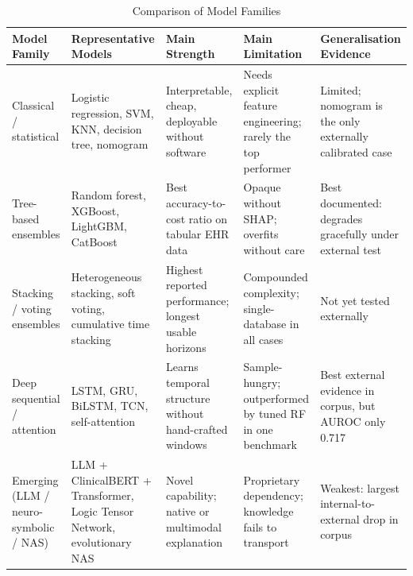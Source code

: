 \documentclass[conference]{IEEEtran}
\begin{document}
\begin{table}[t]
\caption{Comparison of Model Families}
\label{tab:families}
\centering
\footnotesize
\begin{tabular}{@{}p{2.3cm}p{3.5cm}p{2.8cm}p{3.4cm}p{3.6cm}@{}}
\toprule
\textbf{Model Family} & \textbf{Representative Models} & \textbf{Main Strength} & \textbf{Main Limitation} & \textbf{Generalisation Evidence} \\
\midrule
Classical / statistical & Logistic regression, SVM, KNN, decision tree, nomogram & Interpretable, cheap, deployable without software & Needs explicit feature engineering; rarely the top performer & Limited; nomogram is the only externally calibrated case \\
Tree-based ensembles & Random forest, XGBoost, LightGBM, CatBoost & Best accuracy-to-cost ratio on tabular EHR data & Opaque without SHAP; overfits without care & Best documented: degrades gracefully under external test \\
Stacking / voting ensembles & Heterogeneous stacking, soft voting, cumulative time stacking & Highest reported performance; longest usable horizons & Compounded complexity; single-database in all cases & Not yet tested externally \\
Deep sequential / attention & LSTM, GRU, BiLSTM, TCN, self-attention & Learns temporal structure without hand-crafted windows & Sample-hungry; outperformed by tuned RF in one benchmark & Best external evidence in corpus, but AUROC only 0.717 \\
Emerging (LLM / neuro-symbolic / NAS) & LLM + ClinicalBERT + Transformer, Logic Tensor Network, evolutionary NAS & Novel capability; native or multimodal explanation & Proprietary dependency; knowledge fails to transport & Weakest: largest internal-to-external drop in corpus \\
\bottomrule
\end{tabular}
\end{table}
\end{document}
